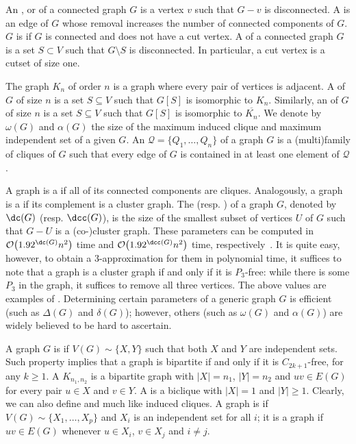 An ,  or  of a connected graph $G$ is a vertex $v$ such that $G - v$ is disconnected.
A  is an edge of $G$ whose removal increases the number of connected components of $G$.
$G$ is  if $G$ is connected and does not have a cut vertex.
A  of a connected graph $G$ is a set $S \subset V$ such that $G \setminus S$ is disconnected.
In particular, a cut vertex is a cutset of size one.

The  graph $K_n$ of order $n$ is a graph where every pair of vertices is adjacent.
A  of $G$ of size $n$ is a set $S \subseteq V$ such that $G[S]$ is isomorphic to $K_n$.
Similarly, an  of $G$ of size $n$ is a set $S \subseteq V$ such that $G[S]$ is isomorphic to $\overline{K_n}$.
We denote by $\omega(G)$ and $\alpha(G)$ the size of the maximum induced clique and maximum independent set of a given $G$.
An  $\mathcal{Q} = \{Q_1, \dots, Q_n\}$ of a graph $G$ is a (multi)family of cliques of $G$ such that every edge of $G$ is contained in at least one element of $\mathcal{Q}$.

A graph is a  if all of its connected components are cliques.
Analogously, a graph is a  if its complement is a cluster graph.
The  (resp. ) of a graph $G$, denoted by $\dc(G)$ (resp. $\dcc(G)$), is the size of the smallest subset of vertices $U$ of $G$ such that $G - U$ is a (co-)cluster graph.
These parameters can be computed in $\bigO{1.92^{\dc( G )}n^2 }$
time and $\bigO{1.92^{\dcc( G )}n^2 }$ time, respectively~\citep{branching-cluster}.
It is quite easy, however, to obtain a 3-approximation for them in polynomial time, it suffices to note that a graph is a cluster graph if and only if it is $P_3$-free: while there is some $P_3$ in the graph, it suffices to remove all three vertices.
The above values are examples of .
Determining certain parameters of a generic graph $G$ is efficient (such as $\Delta(G)$ and $\delta(G)$); however, others (such as $\omega(G)$ and $\alpha(G)$) are widely believed to be hard to ascertain.

A graph $G$ is  if $V(G) \sim \{X, Y\}$ such that both $X$ and $Y$ are independent sets.
Such property implies that a graph is bipartite if and only if it is $C_{2k+1}$-free, for any $k \geq 1$.
A  $K_{n_1,n_2}$ is a bipartite graph with $|X| = n_1$, $|Y| = n_2$ and $uv \in E(G)$ for every pair $u \in X$ and $v \in Y$.
A  is a biclique with $|X| = 1$ and $|Y| \geq 1$.
Clearly, we can also define  and  much like induced cliques.
A graph is  if $V(G) \sim \{X_1, \dots,  X_p\}$ and $X_i$ is an independent set for all $i$; it is a  graph if $uv \in E(G)$ whenever $u \in X_i$, $v \in X_j$ and $i \neq j$.

